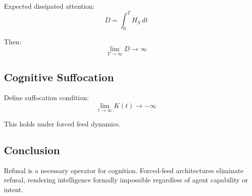 \documentclass[12pt]{article}
\begin{document}
Expected dissipated attention:
\[
D = \int_0^T \dot{H}_S \, dt
\]

Then:
\[
\lim_{T \to \infty} D \to \infty
\]

\subsection{Cognitive Suffocation}

Define suffocation condition:
\[
\lim_{t \to \infty} K(t) \to -\infty
\]

This holds under forced feed dynamics.

\subsection{Conclusion}

Refusal is a necessary operator for cognition.
Forced-feed architectures eliminate refusal,
rendering intelligence formally impossible
regardless of agent capability or intent.
\end{document}
